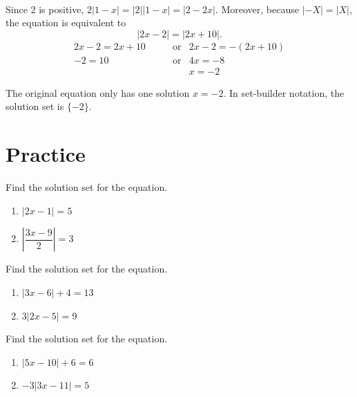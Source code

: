 \documentclass[en,12pt]{elegantbook}
\providecommand{\tightlist}{%
  \setlength{\itemsep}{0pt}\setlength{\parskip}{0pt}}
\let\BeginKnitrBlock\begin \let\EndKnitrBlock\end
\begin{document}
\BeginKnitrBlock{solution}
{}\\

Since \(2\) is positive, \(2|1-x|=|2||1-x|=|2-2x|\). Moreover, because \(|-X|=|X|\), the equation is equivalent to
\[|2x-2|=|2x+10|.\]
\[
\begin{aligned}
    2x-2  =2x+10   & \qquad\text{or} & 2x-2  =-(2x+10) \\
    -2    =10      & \qquad\text{or} & 4x    =-8       \\
                   &          & x     =-2
\end{aligned}
\]

The original equation only has one solution \(x=-2\). In set-builder notation, the solution set is \(\{-2\}\).
\EndKnitrBlock{solution}

\hypertarget{practice-8}{%
\section{Practice}\label{practice-8}}

\BeginKnitrBlock{exercise}
\protect\hypertarget{exr:unnamed-chunk-210}{}{\label{exr:unnamed-chunk-210} }
Find the solution set for the equation.

\begin{enumerate}
\def\labelenumi{\arabic{enumi}.}
\tightlist
\item
  \(|2x-1|=5\)
\item
  \(\left|\dfrac{3x-9}{2}\right|=3\)
\end{enumerate}
\EndKnitrBlock{exercise}

\BeginKnitrBlock{exercise}
\protect\hypertarget{exr:unnamed-chunk-211}{}{\label{exr:unnamed-chunk-211} }
Find the solution set for the equation.

\begin{enumerate}
\def\labelenumi{\arabic{enumi}.}
\tightlist
\item
  \(|3x-6|+4=13\)
\item
  \(3|2x-5|=9\)
\end{enumerate}
\EndKnitrBlock{exercise}

\BeginKnitrBlock{exercise}
\protect\hypertarget{exr:unnamed-chunk-212}{}{\label{exr:unnamed-chunk-212} }
Find the solution set for the equation.

\begin{enumerate}
\def\labelenumi{\arabic{enumi}.}
\tightlist
\item
  \(|5x-10|+6=6\)
\item
  \(-3|3x-11|=5\)
\end{enumerate}
\EndKnitrBlock{exercise}
\end{document}

